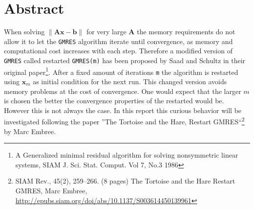 \section{Abstract}
When solving $\|\mathbf{Ax} - \mathbf{b}\|$ for very large $\mathbf{A}$
the memory requirements do not allow it to let the \texttt{GMRES} algorithm iterate until convergence, as memory and computational cost increases with each step. Therefore a modified version of \texttt{GMRES} called restarted \texttt{GMRES(m)} has been proposed by Saad and Schultz in their original paper\footnote{A Generalized minimal residual algorithm for solving nonsymmetric linear systems, SIAM J. Sci. Stat. Comput. Vol 7, No.3 1986}. After a fixed amount of iterations \texttt{m} the algorithm is restarted using $\mathbf{x}_m$ as initial condition for the next run. This changed version  avoids memory problems at the cost of convergence. One would expect that the larger $m$ is chosen the better the convergence properties of the restarted would be. However this is not always the case. In this report this curious behavior will be investigated following the paper \textquotedblright The Tortoise and the Hare, Restart GMRES\textquotedblleft  \footnote{SIAM Rev., 45(2), 259–266. (8 pages) The Tortoise and the Hare Restart GMRES, Marc Embree,
\url{http://epubs.siam.org/doi/abs/10.1137/S003614450139961}}  by Marc Embree.
